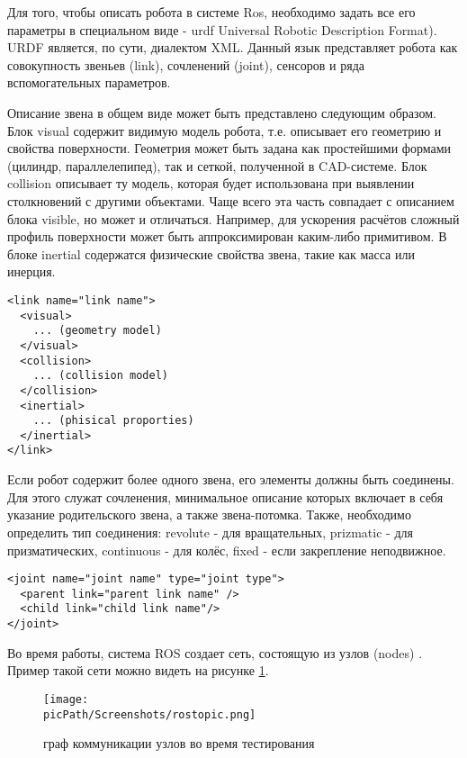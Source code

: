 \documentclass[oneside,final,14pt]{extreport}
\newcommand{\picPath}{img}
\begin{document}
Для того, чтобы описать робота в системе Ros, необходимо задать все его параметры в специальном виде - urdf Universal Robotic Description Format).
URDF является, по сути, диалектом XML. Данный язык представляет робота как совокупность звеньев (link), сочленений (joint), сенсоров и ряда вспомогательных параметров.

Описание звена в общем виде может быть представлено следующим образом. Блок visual содержит видимую модель робота, т.е. описывает его геометрию и свойства поверхности. Геометрия может быть задана как простейшими формами (цилиндр, параллелепипед), так и сеткой, полученной в CAD-системе. Блок collision описывает ту модель, которая будет использована при выявлении столкновений с другими объектами. Чаще всего эта часть совпадает с описанием блока visible, но может и отличаться. Например, для ускорения расчётов сложный профиль поверхности может быть аппроксимирован каким-либо примитивом. В блоке inertial содержатся физические свойства звена, такие как масса или инерция.

\begin{verbatim}
<link name="link name">
  <visual>
    ... (geometry model)
  </visual>
  <collision>
    ... (collision model)
  </collision>
  <inertial>
    ... (phisical proporties)
  </inertial>
</link>
\end{verbatim}


Если робот содержит более одного звена, его элементы должны быть соединены. Для этого служат сочленения, минимальное описание которых включает в себя указание родительского звена, а также звена-потомка. Также, необходимо определить тип соединения: revolute - для вращательных, prizmatic - для призматических, continuous - для колёс, fixed - если закрепление неподвижное.


\begin{verbatim}
<joint name="joint name" type="joint type">
  <parent link="parent link name" /> 
  <child link="child link name"/>
</joint>
\end{verbatim}

Во время работы,  система ROS создает сеть, состоящую из узлов (nodes) . Пример такой сети можно видеть на рисунке \ref{Figure:rosTopic}.

\begin{figure}[H]
\begin{center}
\texttt{[image: \\picPath/Screenshots/rostopic.png]}
\end{center}
  \caption{ граф коммуникации узлов во время тестирования}
  \label{Figure:rosTopic}
\end{figure}
\end{document}
